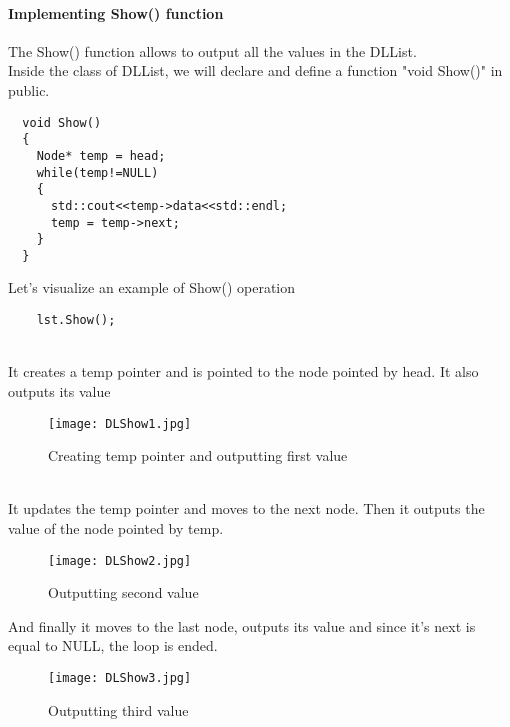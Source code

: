 \documentclass[11pt,fleqn]{book} %
\begin{document}
\paragraph{Implementing Show() function}
The Show()  function allows to output all the values in the DLList. \\
Inside the class of DLList, we will declare and define a function "void Show()" in public.
\begin{lstlisting}
  void Show()
  {
    Node* temp = head;
    while(temp!=NULL)
    {
      std::cout<<temp->data<<std::endl;
      temp = temp->next;
    }
  }
\end{lstlisting}
\newpage
Let's visualize an example of Show() operation
\begin{example}
  \begin{lstlisting}
    lst.Show();
  \end{lstlisting}~\\
  It creates a temp pointer and is pointed to the node pointed by head. It also outputs its value
  \begin{figure}[H]
    \centering
    \texttt{[image: DLShow1.jpg]}
    \caption{Creating temp pointer and outputting first value}
  \end{figure} ~\\
  It updates the temp pointer and moves to the next node. Then it outputs the value of the node pointed by temp.
  \begin{figure}[H]
    \centering
    \texttt{[image: DLShow2.jpg]}
    \caption{Outputting second value}
  \end{figure}
  \newpage
  And finally it moves to the last node, outputs its value and since it's next is equal to NULL, the loop is ended.
  \begin{figure}[H]
    \centering
    \texttt{[image: DLShow3.jpg]}
    \caption{Outputting third value}
  \end{figure} ~\\
\end{example}
\newpage
\end{document}
